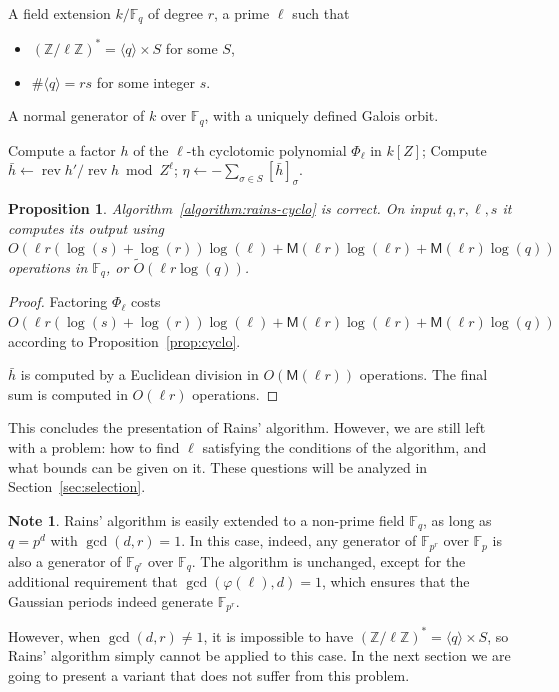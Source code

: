 \documentclass[12pt]{article}
\theoremstyle{plain}
\newtheorem{proposition}[theorem]{Proposition}
\theoremstyle{definition}
\newtheorem{note}[theorem]{Note}
\newcommand{\tildO}{\tilde{O}}
\DeclareMathOperator{\rev}{rev}
\def\Z{\ensuremath{\mathbb{Z}}}
\def\F{\ensuremath{\mathbb{F}}}
\def\MM{\ensuremath{\mathsf{M}}}
\def\euler{\ensuremath{\varphi}}
\newcounter{algorithm}
\begin{document}
\begin{algorithm}
  \label{algorithm:rains-cyclo-2}
  \begin{algorithmic}[1]
    \REQUIRE A field extension $k/\F_q$ of degree $r$, a prime $\ell$ such that
    \begin{itemize}
    \item $(\Z/\ell\Z)^\ast = \langle q\rangle \times S$ for some $S$,
    \item $\#\langle q\rangle = rs$ for some integer $s$.
    \end{itemize}
    \ENSURE A normal generator of $k$ over $\F_q$,
    with a uniquely defined Galois orbit.
    
    \STATE Compute a factor $h$ of the $\ell$-th cyclotomic polynomial $\Phi_\ell$ in $k[Z]$; 
    \STATE Compute $\bar{h} \leftarrow \rev{h'}/\rev{h} \bmod Z^\ell$;
    \RETURN\label{algorithm:rains-cyclo:period} $\eta \leftarrow -\sum_{\sigma\in S}[\bar{h}]_\sigma$.
  \end{algorithmic}
\end{algorithm}


\begin{proposition}
  Algorithm~\ref{algorithm:rains-cyclo} is correct. On input
  $q,r,\ell,s$ it computes its output using
  $O(\ell r(\log(s)+\log(r))\log(\ell) + \MM(\ell r)\log(\ell r) +
  \MM(\ell r)\log(q))$ operations in $\F_q$, or $\tildO(\ell r\log (q))$.
\end{proposition}
\begin{proof}
  Factoring $\Phi_\ell$ costs $O(\ell r(\log(s)+\log(r))\log(\ell) +
  \MM(\ell r)\log(\ell r) + \MM(\ell r)\log(q))$ according to
  Proposition~\ref{prop:cyclo}.

  $\bar{h}$ is computed by a Euclidean division in $O(\MM(\ell r))$
  operations. The final sum is computed in $O(\ell r)$ operations.
\end{proof}


This concludes the presentation of Rains' algorithm. However, we are
still left with a problem: how to find $\ell$ satisfying the
conditions of the algorithm, and what bounds can be given on it. These
questions will be analyzed in Section~\ref{sec:selection}.

\begin{note}
  \label{note:rains-non-prime}
  Rains' algorithm is easily extended to a non-prime field $\F_q$, as
  long as $q=p^d$ with $\gcd(d,r)=1$. In this case, indeed, any
  generator of $\F_{p^r}$ over $\F_p$ is also a generator of
  $\F_{q^r}$ over $\F_q$. The algorithm is unchanged, except for the
  additional requirement that $\gcd(\euler(\ell),d)=1$, which ensures
  that the Gaussian periods indeed generate $\F_{p^r}$.

  However, when $\gcd(d,r)\ne 1$, it is impossible to have
  $(\Z/\ell\Z)^\ast=\langle q\rangle\times S$, so Rains' algorithm
  simply cannot be applied to this case. In the next section we are
  going to present a variant that does not suffer from this problem.
\end{note}
\end{document}
